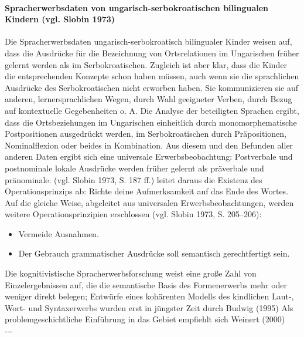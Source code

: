 \documentclass[
  letterpaper,
]{scrbook}
\let\oldparagraph\paragraph
\renewcommand{\paragraph}[1]{\oldparagraph{#1}\mbox{}}
\begin{document}
\hypertarget{spracherwerbsdaten-von-ungarisch-serbokroatischen-bilingualen-kindern-vgl.-slobin-1973}{%
\paragraph{Spracherwerbsdaten von ungarisch-serbokroatischen bilingualen
Kindern (vgl. Slobin
1973)}\label{spracherwerbsdaten-von-ungarisch-serbokroatischen-bilingualen-kindern-vgl.-slobin-1973}}

Die Spracherwerbsdaten ungarisch-serbokroatisch bilingualer Kinder
weisen auf, dass die Ausdrücke für die Bezeichnung von Ortsrelationen im
Ungarischen früher gelernt werden als im Serbokroatischen. Zugleich ist
aber klar, dass die Kinder die entsprechenden Konzepte schon haben
müssen, auch wenn sie die sprachlichen Ausdrücke des Serbokroatischen
nicht erworben haben. Sie kommunizieren sie auf anderen,
lernersprachlichen Wegen, durch Wahl geeigneter Verben, durch Bezug auf
kontextuelle Gegebenheiten o. A. Die Analyse der beteiligten Sprachen
ergibt, dass die Ortsbeziehungen im Ungarischen einheitlich durch
monomorphematische Postpositionen ausgedrückt werden, im
Serbokroatischen durch Präpositionen, Nominalflexion oder beides in
Kombination. Aus diesem und den Befunden aller anderen Daten ergibt sich
eine universale Erwerbsbeobachtung: Postverbale und postnominale lokale
Ausdrücke werden früher gelernt als präverbale und pränominale. (vgl.
Slobin 1973, S. 187 ff.) leitet daraus die Existenz des
Operationsprinzips ab: Richte deine Aufmerksamkeit auf das Ende des
Wortes. Auf die gleiche Weise, abgeleitet aus universalen
Erwerbsbeobachtungen, werden weitere Operationsprinzipien erschlossen
(vgl. Slobin 1973, S. 205--206):

\begin{itemize}
\item
  Vermeide Ausnahmen.
\item
  Der Gebrauch grammatischer Ausdrücke soll semantisch gerechtfertigt
  sein.
\end{itemize}

Die kognitivistische Spracherwerbsforschung weist eine große Zahl von
Einzelergebnissen auf, die die semantische Basis des Formenerwerbs mehr
oder weniger direkt belegen; Entwürfe eines kohärenten Modells des
kindlichen Laut-, Wort- und Syntaxerwerbs wurden erst in jüngster Zeit
durch Budwig (1995) Als problemgeschichtliche Einführung in das Gebiet
empfiehlt sich Weinert (2000)\\

-\/-\/-
\end{document}

